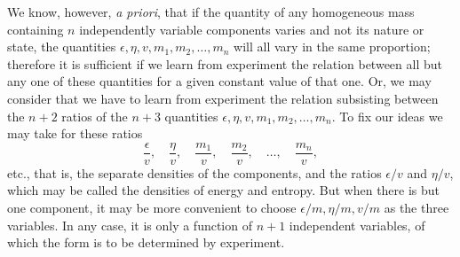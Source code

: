 \documentclass[11pt]{article}
\newcommand{\eps}{\epsilon}
\begin{document}
We know, however, \textit{a priori}, that if the quantity of any homogeneous mass containing \(n\) independently variable components varies and not its nature or state, the quantities \(\eps,\eta,v,m_1,m_2,\ldots,m_n\) will all vary in the same proportion; therefore it is sufficient if we learn from experiment the relation between all but any one of these quantities for a given constant value of that one. Or, we may consider that we have to learn from experiment the relation subsisting between the \(n+2\) ratios of the \(n+3\) quantities \(\eps,\eta,v,m_1,m_2,\ldots,m_n\). To fix our ideas we may take for these ratios
\[
\frac{\eps}{v},\quad \frac{\eta}{v},\quad \frac{m_1}{v},\quad \frac{m_2}{v},\quad \ldots,\quad \frac{m_n}{v},
\]
etc., that is, the separate densities of the components, and the ratios \(\eps/v\) and \(\eta/v\), which may be called the densities of energy and entropy. But when there is but one component, it may be more convenient to choose \(\eps/m,\eta/m,v/m\) as the three variables. In any case, it is only a function of \(n+1\) independent variables, of which the form is to be determined by experiment.
\end{document}
